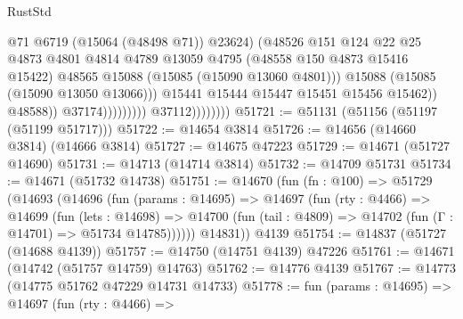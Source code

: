 \begin{lexlean}{RustStd}
\begin{coremodule}
                                                  @71
                                                  @6719
                                                  (@15064 (@48498 @71))
                                                  @23624)
                                                (@48526
                                                  @151
                                                  @124
                                                  @22
                                                  @25
                                                  @4873
                                                  @4801
                                                  @4814
                                                  @4789
                                                  @13059
                                                  @4795
                                                  (@48558 @150 @4873 @15416 @15422)
                                                  @48565
                                                  @15088
                                                  (@15085 (@15090 @13060 @4801)))
                                                @15088
                                                (@15085 (@15090 @13050 @13066)))
                                              @15441
                                              @15444
                                              @15447
                                              @15451
                                              @15456
                                              @15462))
                                          @48588))
                                      @37174)))))))))
                    @37112))))))))
@51721 := @51131 (@51156 (@51197 (@51199 @51717)))
@51722 := @14654 @3814
@51726 := @14656 (@14660 @3814) (@14666 @3814)
@51727 := @14675 @47223
@51729 := @14671 (@51727 @14690)
@51731 := @14713 (@14714 @3814)
@51732 := @14709 @51731
@51734 := @14671 (@51732 @14738)
@51751 := @14670
    (fun (fn : @100) =>
    @51729
      (@14693
        (@14696
          (fun (params : @14695) =>
          @14697
            (fun (rty : @4466) =>
            @14699
              (fun (lets : @14698) =>
              @14700 (fun (tail : @4809) => @14702 (fun (Γ : @14701) => @51734 @14785))))))
        @14831))
    @4139
@51754 := @14837 (@51727 (@14688 @4139))
@51757 := @14750 (@14751 @4139) @47226
@51761 := @14671 (@14742 (@51757 @14759) @14763)
@51762 := @14776 @4139
@51767 := @14773 (@14775 @51762 @47229 @14731 @14733)
@51778 := fun (params : @14695) =>
  @14697
    (fun (rty : @4466) =>

\end{coremodule}
\end{lexlean}
